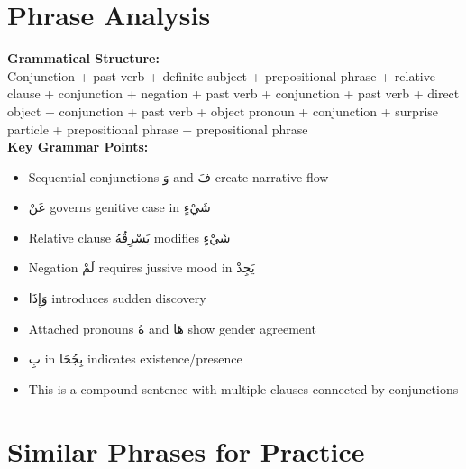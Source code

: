 \documentclass[letter,12pt]{article}
\begin{document}
\section{Phrase Analysis}
\begin{tcolorbox}[colback=boxcolor,colframe=headercolor,breakable]
\textbf{Grammatical Structure:}\\
Conjunction + past verb + definite subject + prepositional phrase + relative clause + conjunction + negation + past verb + conjunction + past verb + direct object + conjunction + past verb + object pronoun + conjunction + surprise particle + prepositional phrase + prepositional phrase \\

\textbf{Key Grammar Points:}
\begin{itemize}
\item Sequential conjunctions \textarabic{وَ} and \textarabic{فَ} create narrative flow
\item \textarabic{عَنْ} governs genitive case in \textarabic{شَيْءٍ}
\item Relative clause \textarabic{يَسْرِقُهُ} modifies \textarabic{شَيْءٍ}
\item Negation \textarabic{لَمْ} requires jussive mood in \textarabic{يَجِدْ}
\item \textarabic{وَإِذَا} introduces sudden discovery
\item Attached pronouns \textarabic{هُ} and \textarabic{هَا} show gender agreement
\item \textarabic{بِ} in \textarabic{بِجُحَا} indicates existence/presence
\item This is a compound sentence with multiple clauses connected by conjunctions
\end{itemize}
\end{tcolorbox}

\section{Similar Phrases for Practice}
\end{document}
